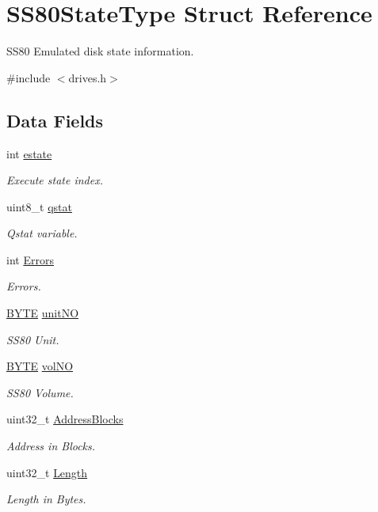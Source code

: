 \hypertarget{structSS80StateType}{}\section{S\+S80\+State\+Type Struct Reference}
\label{structSS80StateType}


S\+S80 Emulated disk state information.  




{\ttfamily \#include $<$drives.\+h$>$}

\subsection*{Data Fields}
\begin{DoxyCompactItemize}
\item 
int \hyperlink{structSS80StateType_ae4a94143cb4201687be4e33684be057e}{estate}
\begin{DoxyCompactList}\small\item\em Execute state index. \end{DoxyCompactList}\item 
uint8\+\_\+t \hyperlink{structSS80StateType_ad4911c7b89ec1ff2c0aa01881b1e3d3a}{qstat}
\begin{DoxyCompactList}\small\item\em Qstat variable. \end{DoxyCompactList}\item 
int \hyperlink{structSS80StateType_a7a5c363c6f617ee457a4daacadb3a7b2}{Errors}
\begin{DoxyCompactList}\small\item\em Errors. \end{DoxyCompactList}\item 
\hyperlink{ff_8h_a4ae1dab0fb4b072a66584546209e7d58}{B\+Y\+TE} \hyperlink{structSS80StateType_ad2b3cd5353f5650df931520a39b385e7}{unit\+NO}
\begin{DoxyCompactList}\small\item\em S\+S80 Unit. \end{DoxyCompactList}\item 
\hyperlink{ff_8h_a4ae1dab0fb4b072a66584546209e7d58}{B\+Y\+TE} \hyperlink{structSS80StateType_ac197866db7677ec4bf9ad5e29e4a58a3}{vol\+NO}
\begin{DoxyCompactList}\small\item\em S\+S80 Volume. \end{DoxyCompactList}\item 
uint32\+\_\+t \hyperlink{structSS80StateType_a6cffa1e36a57bce4188ede4bd9dbd7ad}{Address\+Blocks}
\begin{DoxyCompactList}\small\item\em Address in Blocks. \end{DoxyCompactList}\item 
uint32\+\_\+t \hyperlink{structSS80StateType_a507159f0a0a4f3127488081fd618e8f6}{Length}
\begin{DoxyCompactList}\small\item\em Length in Bytes. \end{DoxyCompactList}\end{DoxyCompactItemize}


